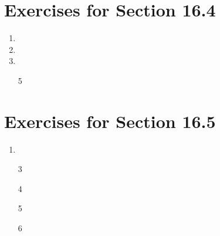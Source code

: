 \documentclass[12pt]{article}
\begin{document}
\section*{Exercises for Section 16.4}
\begin{enumerate}
	\item 
	\item 
	\item 
	\item [5]
\end{enumerate}
\section*{Exercises for Section 16.5}
\begin{enumerate}
	\item 
	\item [3]
	\item [4]
	\item [5]
	\item [6]
\end{enumerate}
\end{document}
